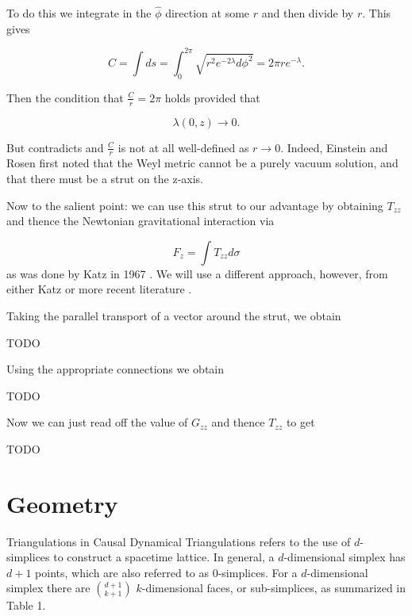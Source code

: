 \documentclass[12pt]{article}
\begin{document}
To do this we integrate in the $\hat{\phi}$ direction at
some $r$ and then divide by $r$. This gives

\begin{equation}
  \label{eq:phi-hat-length}
  C=\int ds =
  \int_0^{2\pi}\sqrt{r^2e^{-2\lambda}d\phi^2}={2\pi re^{-\lambda}}.
\end{equation}

Then the condition that $\frac{C}{r}=2\pi$ holds provided that

\begin{equation}
	\label{eq:lambda-elem-flat}
	\lambda(0,z)\rightarrow 0.
\end{equation} 

But  contradicts  and $\frac{C}{r}$ is not at all well-defined as $r\rightarrow 0$. Indeed, Einstein and Rosen \cite{einstein-rosen-1936} first noted that the Weyl metric cannot be a purely vacuum solution, and that there must be a strut on the z-axis.

Now to the salient point: we can use this strut to our advantage by obtaining $T_{zz}$ and thence the Newtonian gravitational interaction via

\begin{equation}
	\label{eq:F_z}
	F_{z}=\int T_{zz}d\sigma
\end{equation}
as was done by Katz in 1967 \cite{katz1967derivation}. We will use a different approach, however, from either Katz or more recent literature \cite{letelier_superposition_1997}.

Taking the parallel transport of a vector around the strut, we obtain

TODO

Using the appropriate connections we obtain

TODO

Now we can just read off the value of $G_{zz}$ and thence $T_{zz}$ to get

TODO

\section{Geometry}

Triangulations in Causal Dynamical Triangulations refers to the use of $d$-simplices to construct a spacetime lattice. In general, a $d$-dimensional simplex has $d+1$ points, which are also referred to as $0$-simplices. For a $d$-dimensional simplex there are $\binom{d+1}{k+1}$ $k$-dimensional faces, or sub-simplices, as summarized in Table 1.
\end{document}
